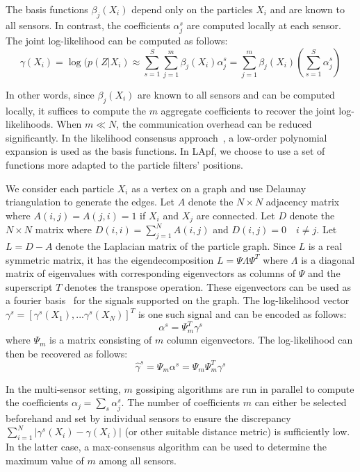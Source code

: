 \documentclass[10pt,letterpaper,final]{article}
\begin{document}
The basis functions $\beta_j(X_i)$ depend only on the particles $X_i$ and are known to all sensors. In contrast, the coefficients $\alpha_j^s$ are computed locally at each sensor. The joint log-likelihood can be computed as follows:
\begin{equation}
\gamma(X_i) = \log (p(Z|X_i) \approx \sum_{s=1}^S \sum_{j=1}^m \beta_j(X_i)\alpha_j^s = \sum_{j=1}^m \beta_j(X_i)\left(\sum_{s=1}^S\alpha_j^s\right)
\end{equation}

In other words, since $\beta_j(X_i)$ are known to all sensors and can be computed locally, it suffices to compute the $m$ aggregate coefficients to recover the joint log-likelihoods. When $m\ll N$, the communication overhead can be reduced significantly. In the likelihood consensus approach~\cite{Hlinka2012}, a low-order polynomial expansion is used as the basis functions. In LApf, we choose to use a set of functions more adapted to the particle filters' positions. 

We consider each particle $X_i$ as a vertex on a graph and use Delaunay triangulation to generate the edges. Let $A$ denote the $N\times N$ adjacency matrix where $A(i,j)=A(j,i)=1$ if $X_i$ and $X_j$ are connected. Let $D$ denote the $N\times N$ matrix where $D(i,i)=\sum_{j=1}^N A(i,j)$ and $D(i,j)=0\quad i \neq j$. Let $L=D-A$ denote the Laplacian matrix of the particle graph. Since $L$ is a real symmetric matrix, it has the eigendecomposition $L=\Psi \Lambda \Psi^T$ where $\Lambda$ is a diagonal matrix of eigenvalues with corresponding eigenvectors as columns of $\Psi$ and the superscript $T$ denotes the transpose operation. These eigenvectors can be used as a fourier basis~\cite{Zhu2012} for the signals supported on the graph. The log-likelihood vector $\gamma^s = \left[\gamma^s(X_1),...\gamma^s(X_N) \right]^T$ is one such signal and can be encoded as follows:
\begin{equation}
\alpha^s = \Psi_m^T \gamma^s
\end{equation}
where $\Psi_m$ is a matrix consisting of $m$ column eigenvectors. The log-likelihood can then be recovered as follows:
\begin{equation}
\hat{\gamma}^s = \Psi_m \alpha^s = \Psi_m\Psi_m^T\gamma^s
\end{equation}

In the multi-sensor setting, $m$ gossiping algorithms are run in parallel to compute the coefficients $\alpha_j=\sum_s \alpha_j^s$. The number of coefficients $m$ can either be selected beforehand and set by individual sensors to ensure the discrepancy $\sum_{i=1}^N|\gamma^s(X_i)-\gamma(X_i)|$ (or other suitable distance metric) is sufficiently low. In the latter case, a max-consensus algorithm can be used to determine the maximum value of $m$ among all sensors. 
\end{document}
